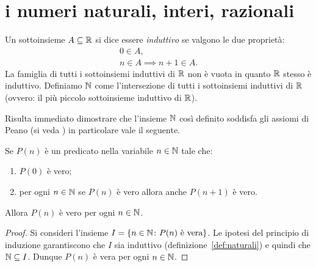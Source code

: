 \section{i numeri naturali, interi, razionali}

\begin{definition}
\label{def:naturali}
Un sottoinsieme $A\subseteq \mathbb R$ si dice essere \emph{induttivo}
se valgono le due proprietà:
\begin{gather*}
  0 \in A, \\
  n\in A \implies n+1 \in A.
\end{gather*}
La famiglia di tutti i sottoinsiemi induttivi di $\mathbb R$ non è vuota
in quanto $\mathbb R$ stesso è induttivo. Definiamo $\NN$ come l'intersezione
di tutti i sottoinsiemi induttivi di $\mathbb R$ (ovvero: il più piccolo sottoinsieme induttivo di $\mathbb R$).
\mymargin{$\NN$}
\end{definition}

Risulta immediato dimostrare che l'insieme $\NN$ così definito
soddisfa gli assiomi di Peano (si veda \cite{appunti_logica})
in particolare vale il seguente.

\begin{theorem}
Se $P(n)$ è un predicato nella variabile $n\in \mathbb N$ tale che:
\begin{enumerate}
\item $P(0)$ è vero;
\item per ogni $n\in \mathbb N$ se $P(n)$ è vero allora anche $P(n+1)$ è vero.
\end{enumerate}
Allora $P(n)$ è vero per ogni $n\in \mathbb N$.
\end{theorem}
%
\begin{proof}
Si consideri l'insieme $I = \{n \in \mathbb N\colon P(n) \text{ è vera}\}$.
Le ipotesi del principio di induzione garantiscono che $I$ sia induttivo
(definizione~\ref{def:naturali})
e quindi che $\mathbb N \subseteq I$. Dunque $P(n)$ è vera per ogni $n\in \mathbb N$.
\end{proof}

